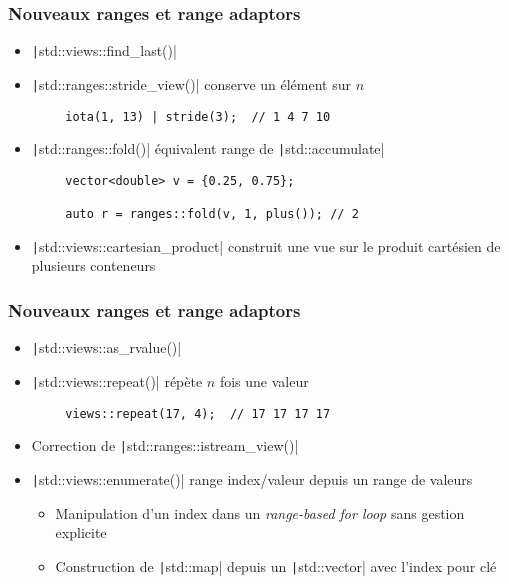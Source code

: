 \documentclass[C++.tex]{subfiles}
\begin{document}
\begin{frame}[fragile]
	\frametitle{Nouveaux ranges et range adaptors}
	\begin{itemize}
		\item \texttt|std::views::find_last()|
		\item \texttt|std::ranges::stride_view()| conserve un élément sur $n$
	\end{itemize}

	\begin{verbatim}
		iota(1, 13) | stride(3);  // 1 4 7 10
	\end{verbatim}

	\begin{itemize}
		\item \texttt|std::ranges::fold()| équivalent range de \texttt|std::accumulate|
	\end{itemize}

	\begin{verbatim}
		vector<double> v = {0.25, 0.75};

		auto r = ranges::fold(v, 1, plus()); // 2
	\end{verbatim}

	\begin{itemize}
		\item \texttt|std::views::cartesian_product| construit une vue sur le produit cartésien de plusieurs conteneurs
	\end{itemize}
\end{frame}

\begin{frame}[fragile]
	\frametitle{Nouveaux ranges et range adaptors}
	\begin{itemize}
		\item \texttt|std::views::as_rvalue()|
		\item \texttt|std::views::repeat()| répète $n$ fois une valeur
	\end{itemize}

	\begin{verbatim}
		views::repeat(17, 4);  // 17 17 17 17
	\end{verbatim}

	\begin{itemize}
		\item Correction de \texttt|std::ranges::istream_view()|
		\item \texttt|std::views::enumerate()| range index/valeur depuis un range de valeurs
		\begin{itemize}
			\item Manipulation d'un index dans un \textit{range-based for loop} sans gestion explicite
			\item Construction de \texttt|std::map| depuis un \texttt|std::vector| avec l'index pour clé
		\end{itemize}
	\end{itemize}
\end{frame}
\end{document}
